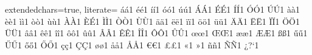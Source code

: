 {  %
  extendedchars=true,              %
  literate=
  {á}{{\'a}}1 {é}{{\'e}}1 {í}{{\'i}}1 {ó}{{\'o}}1 {ú}{{\'u}}1
  {Á}{{\'A}}1 {É}{{\'E}}1 {Í}{{\'I}}1 {Ó}{{\'O}}1 {Ú}{{\'U}}1
  {à}{{\`a}}1 {è}{{\`e}}1 {ì}{{\`i}}1 {ò}{{\`o}}1 {ù}{{\`u}}1
  {À}{{\`A}}1 {È}{{\'E}}1 {Ì}{{\`I}}1 {Ò}{{\`O}}1 {Ù}{{\`U}}1
  {ä}{{\"a}}1 {ë}{{\"e}}1 {ï}{{\"i}}1 {ö}{{\"o}}1 {ü}{{\"u}}1
  {Ä}{{\"A}}1 {Ë}{{\"E}}1 {Ï}{{\"I}}1 {Ö}{{\"O}}1 {Ü}{{\"U}}1
  {â}{{\^a}}1 {ê}{{\^e}}1 {î}{{\^i}}1 {ô}{{\^o}}1 {û}{{\^u}}1
  {Â}{{\^A}}1 {Ê}{{\^E}}1 {Î}{{\^I}}1 {Ô}{{\^O}}1 {Û}{{\^U}}1
  {œ}{{\oe}}1 {Œ}{{\OE}}1 {æ}{{\ae}}1 {Æ}{{\AE}}1 {ß}{{\ss}}1
  {ű}{{\H{u}}}1 {Ű}{{\H{U}}}1 {ő}{{\H{o}}}1 {Ő}{{\H{O}}}1
  {ç}{{\c c}}1 {Ç}{{\c C}}1 {ø}{{\o}}1 {å}{{\r a}}1 {Å}{{\r A}}1
  {€}{{\euro}}1 {£}{{\pounds}}1 {«}{{\guillemotleft}}1
  {»}{{\guillemotright}}1 {ñ}{{\~n}}1 {Ñ}{{\~N}}1 {¿}{{?`}}1
}
